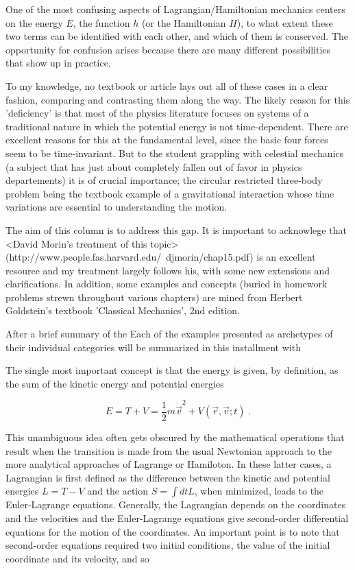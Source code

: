 \documentclass[12pt]{article}
\begin{document}
One of the most confusing aspects of Lagrangian/Hamiltonian mechanics centers on the energy $E$, the function $h$ (or the Hamiltonian $H$), to what extent these two terms can be identified with each other, and which of them is conserved.  The opportunity for confusion arises because there are many different possibilities that show up in practice.  


To my knowledge, no textbook or article lays out all of these cases in a clear fashion, comparing and contrasting them along the way.  The likely reason for this 'deficiency' is that most of the physics literature focuses on systems of a traditional nature in which the potential energy is not time-dependent.  There are excellent reasons for this at the fundamental level, since the basic four forces seem to be time-invariant.  But to the student grappling with celestial mechanics (a subject that has just about completely fallen out of favor in physics departements) it is of crucial importance; the circular restricted three-body problem being the textbook example of a gravitational interaction whose time variations are essential to understanding the motion.  

The aim of this column is to address this gap.  It is important to acknowlege that <David Morin's treatment of this topic> (http://www.people.fas.harvard.edu/~djmorin/chap15.pdf) is an excellent resource and my treatment largely follows his, with some new extensions and clarifications.  In addition, some examples and concepts (buried in homework problems strewn throughout various chapters) are mined from Herbert Goldstein's textbook 'Classical Mechanics', 2nd edition.  

After a brief summary of the Each of the examples presented as archetypes of their individual categories will be summarized in this installment with  

The single most important concept is that the energy is given, by definition, as the sum of the kinetic energy and potential energies

\[ E = T + V = \frac{1}{2} m \dot {\vec v} ^2 + V(\vec r, \vec v; t) \; . \]

This unambiguous idea often gets obscured by the mathematical operations that result when the transition is made from the usual Newtonian approach to the more analytical approaches of Lagrange or Hamiloton.  In these latter cases, a Lagrangian is first defined as the difference between the kinetic and potential energies $L = T - V$ and the action $S = \int dt L $, when minimized, leads to the Euler-Lagrange equations.  Generally, the Lagrangian depends on the coordinates and the velocities and the Euler-Lagrange equations give second-order differential equations for the motion of the coordinates.  An important point is to note that second-order equations required two initial conditions, the value of the initial coordinate and its velocity, and so 
\end{document}
